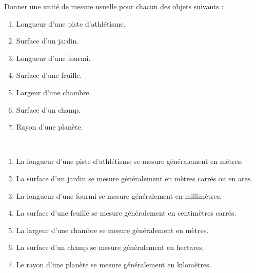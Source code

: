 \begin{colonne*exercice}
\medskip


\begin{exercice} %
   Donner une unité de mesure usuelle pour chacun des objets suivants :
   \begin{enumerate}
      \item Longueur d'une piste d'athlétisme.
      \item Surface d'un jardin.
      \item Longueur d'une fourmi.
      \item Surface d'une feuille.
      \item Largeur d'une chambre.
      \item Surface d'un champ.
      \item Rayon d'une planète.
   \end{enumerate}
\end{exercice}

\begin{corrige}
\ \\ [-5mm]
   \begin{enumerate}
      \item La longueur d'une piste d'athlétisme se mesure généralement en {\blue mètres}.
      \item La surface d'un jardin  se mesure généralement en {\blue mètres carrés} ou en {\blue ares}.
      \item La longueur d'une fourmi se mesure généralement en {\blue millimètres}.
      \item La surface d'une feuille se mesure généralement en {\blue centimètres carrés}.
      \item La largeur d'une chambre se mesure généralement en {\blue mètres}.
      \item La surface d'un champ se mesure généralement en {\blue hectares}.
      \item Le rayon d'une planète se mesure généralement en {\blue kilomètres}.
   \end{enumerate}
\end{corrige}

\medskip



\end{colonne*exercice}
